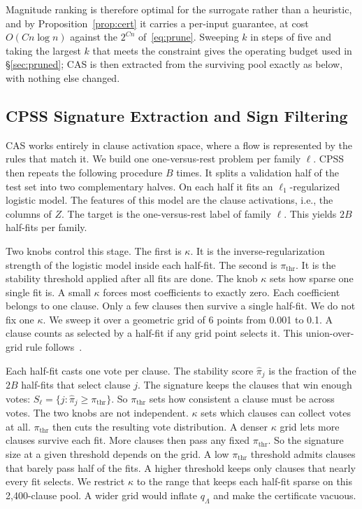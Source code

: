 \documentclass[conference]{IEEEtran}
\begin{document}
Magnitude ranking is therefore optimal for the surrogate rather than a
heuristic, and by Proposition~\ref{prop:cert} it carries a per-input
guarantee, at cost $O(Cn\log n)$ against the $2^{Cn}$ of~\eqref{eq:prune}. Sweeping
$k$ in steps of five and taking the largest $k$ that meets the constraint
gives the operating budget used in \S\ref{sec:pruned}; CAS is then
extracted from the surviving pool exactly as below, with nothing else
changed.

\subsection{CPSS Signature Extraction and Sign Filtering}
\label{sec:cpss}
CAS works entirely
in clause activation space, where a flow is represented by the rules that match it. We build one one-versus-rest problem
per family $\ell$. CPSS then repeats the following procedure $B$ times. It
splits a validation half of the test set into two complementary halves. On
each half it fits an $\ell_1$-regularized logistic model. The features of
this model are the clause activations, i.e., the columns of $Z$. The target
is the one-versus-rest label of family $\ell$. This yields $2B$ half-fits
per family.

Two knobs control this stage. The first is $\kappa$. It is the
inverse-regularization strength of the logistic model inside each half-fit.
The second is $\pi_{\mathrm{thr}}$. It is the stability threshold applied
after all fits are done. The knob $\kappa$ sets how sparse one single fit is. A small $\kappa$
forces most coefficients to exactly zero. Each coefficient belongs to one
clause. Only a few clauses then survive a single half-fit. We do not fix one $\kappa$. We sweep it over a geometric
grid of 6 points from 0.001 to 0.1. A clause counts as selected by a
half-fit if any grid point selects it. This union-over-grid rule
follows~\cite{shah2013}.

Each half-fit casts one vote per clause. The stability score
$\hat{\pi}_j$ is the fraction of the $2B$ half-fits that select clause $j$.
The signature keeps the clauses that win enough votes:
$S_\ell = \{j : \hat{\pi}_j \ge \pi_{\mathrm{thr}}\}$. So
$\pi_{\mathrm{thr}}$ sets how consistent a clause must be across votes. The two knobs are not independent. $\kappa$ sets which clauses can collect
votes at all. $\pi_{\mathrm{thr}}$ then cuts the resulting vote
distribution. A denser $\kappa$ grid lets more clauses survive each fit.
More clauses then pass any fixed $\pi_{\mathrm{thr}}$. So the signature
size at a given threshold depends on the grid. A low $\pi_{\mathrm{thr}}$ threshold admits clauses that barely pass
half of the fits. A higher threshold
keeps only clauses that nearly every fit selects. We restrict $\kappa$ to the range that keeps each half-fit sparse on this
2{,}400-clause pool. A wider grid would inflate $q_\Lambda$ and make the
certificate vacuous.
\end{document}
